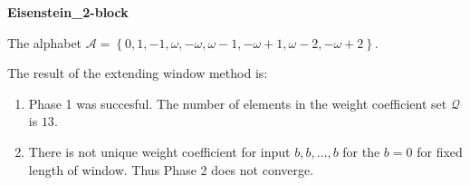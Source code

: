 \begin{exmp}
\textbf{ Eisenstein\_2-block }

\label{ex:Eisenstein2-block}

The alphabet $\mathcal{A} =\left\{0, 1, -1, \omega, -\omega, \omega - 1, -\omega + 1, \omega - 2, -\omega + 2\right\}$.

The result of the extending window method is:
\begin{enumerate}
    \item Phase 1 was succesful.
The number of elements in the weight coefficient set $\mathcal{Q}$ is $13$.

    \item There is not unique weight coefficient for input $b,b,\dots,b$ for the $b= 0 $ for fixed length of window. Thus Phase 2 does not converge.

\end{enumerate}
\end{exmp}
